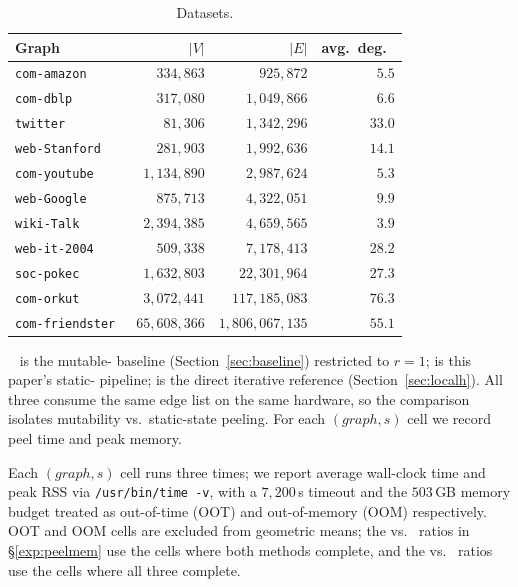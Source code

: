 \begin{table}[t]
\centering
\caption{Datasets.}
\label{tab:datasets}
\tiny
\begin{tabular}{lrrr}
\toprule
Graph & $|V|$ & $|E|$ & avg.\ deg.\ \\
\midrule
\texttt{com-amazon}~\cite{communityFinder}      & $334{,}863$    & $925{,}872$            & $5.5$  \\
\texttt{com-dblp}~\cite{communityFinder}        & $317{,}080$    & $1{,}049{,}866$        & $6.6$  \\
\texttt{twitter}~\cite{communityFinder}         & $\phantom{0,0}81{,}306$ & $1{,}342{,}296$ & $33.0$ \\
\texttt{web-Stanford}~\cite{communityFinder}    & $281{,}903$    & $1{,}992{,}636$        & $14.1$ \\
\texttt{com-youtube}~\cite{communityFinder}     & $1{,}134{,}890$ & $2{,}987{,}624$       & $5.3$  \\
\texttt{web-Google}~\cite{communityFinder}      & $875{,}713$    & $4{,}322{,}051$        & $9.9$  \\
\texttt{wiki-Talk}~\cite{communityFinder}       & $2{,}394{,}385$ & $4{,}659{,}565$       & $3.9$  \\
\texttt{web-it-2004}~\cite{communityFinder}     & $509{,}338$    & $7{,}178{,}413$        & $28.2$ \\
\texttt{soc-pokec}~\cite{communityFinder}       & $1{,}632{,}803$ & $22{,}301{,}964$      & $27.3$ \\
\texttt{com-orkut}~\cite{communityFinder}       & $3{,}072{,}441$ & $117{,}185{,}083$     & $76.3$ \\
\texttt{com-friendster}~\cite{communityFinder}  & $65{,}608{,}366$ & $1{,}806{,}067{,}135$ & $55.1$ \\
\bottomrule
\end{tabular}
\end{table}

\cbnd{}~\cite{NuclearCD} is the mutable-\cpi{} baseline (Section~\ref{sec:baseline}) restricted to $r{=}1$; \spinStar{} is this paper's static-\cpi{} pipeline; \spin{} is the direct iterative reference (Section~\ref{sec:localh}).
%
All three consume the same edge list on the same hardware, so the comparison isolates mutability vs.\ static-state peeling.
%
For each $(graph,s)$ cell we record peel time and peak memory.

Each $(graph,s)$ cell runs three times; we report average wall-clock time and peak RSS via \texttt{/usr/bin/time -v}, with a $7{,}200$\,s timeout and the $503$\,GB memory budget treated as out-of-time (OOT) and out-of-memory (OOM) respectively.
%
OOT and OOM cells are excluded from geometric means; the \spinStar{} vs.\ \cbnd{} ratios in \S\ref{exp:peelmem} use the cells where both methods complete, and the \spinStar{} vs.\ \spin{} ratios use the cells where all three complete.


